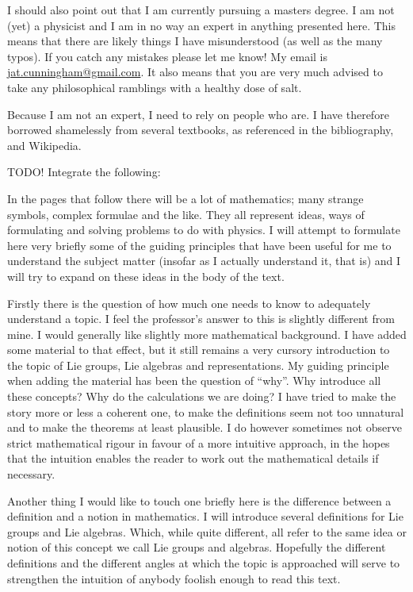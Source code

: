\documentclass{report}
\begin{document}
I should also point out that I am currently pursuing a masters degree. I am not (yet) a physicist and I am in no way an expert in anything presented here. This means that there are likely things I have misunderstood (as well as the many typos). If you catch any mistakes please let me know! My email is \url{jat.cunningham@gmail.com}. It also means that you are very much advised to take any philosophical ramblings with a healthy dose of salt.

Because I am not an expert, I need to rely on people who are. I have therefore borrowed shamelessly from several textbooks, as referenced in the bibliography, and Wikipedia.

TODO! Integrate the following:

In the pages that follow there will be a lot of mathematics; many strange symbols, complex formulae and the like. They all represent ideas, ways of formulating and solving problems to do with physics. I will attempt to formulate here very briefly some of the guiding principles that have been useful for me to understand the subject matter (insofar as I actually understand it, that is) and I will try to expand on these ideas in the body of the text.

Firstly there is the question of how much one needs to know to adequately understand a topic. I feel the professor's answer to this is slightly different from mine. I would generally like slightly more mathematical background. I have added some material to that effect, but it still remains a very cursory introduction to the topic of Lie groups, Lie algebras and representations. My guiding principle when adding the material has been the question of ``why''. Why introduce all these concepts? Why do the calculations we are doing? I have tried to make the story more or less a coherent one, to make the definitions seem not too unnatural and to make the theorems at least plausible. I do however sometimes not observe strict mathematical rigour in favour of a more intuitive approach, in the hopes that the intuition enables the reader to work out the mathematical details if necessary.

Another thing I would like to touch one briefly here is the difference between a definition and a notion in mathematics. I will introduce several definitions for Lie groups and Lie algebras. Which, while quite different, all refer to the same idea or notion of this concept we call Lie groups and algebras. Hopefully the different definitions and the different angles at which the topic is approached will serve to strengthen the intuition of anybody foolish enough to read this text.
\end{document}
